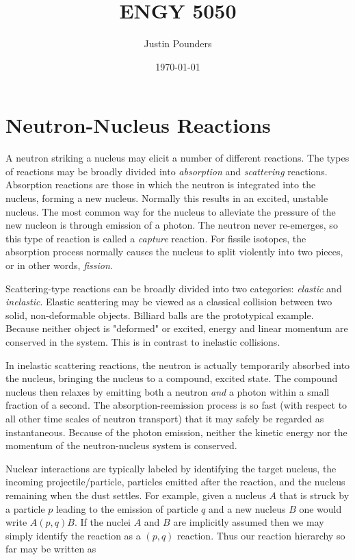 \documentclass[11pt]{article}
\author{Justin Pounders}
\date{\today}
\title{ENGY 5050}
\begin{document}
\maketitle
\tableofcontents


\section{Neutron-Nucleus Reactions}
\label{sec:orgheadline11}
A neutron striking a nucleus may elicit a number of different reactions.  The types of reactions may be broadly divided into \emph{absorption} and \emph{scattering} reactions.  Absorption reactions are those in which the neutron is integrated into the nucleus, forming a new nucleus.  Normally this results in an excited, unstable nucleus.  The most common way for the nucleus to alleviate the pressure of the new nucleon is through emission of a photon.  The neutron never re-emerges, so this type of reaction is called a \emph{capture} reaction.  For fissile isotopes, the absorption process normally causes the nucleus to split violently into two pieces, or in other words, \emph{fission}.

Scattering-type reactions can be broadly divided into two categories: \emph{elastic} and \emph{inelastic}.  Elastic scattering may be viewed as a classical collision between two solid, non-deformable objects.  Billiard balls are the prototypical example.  Because neither object is "deformed" or excited, energy and linear momentum are conserved in the system.  This is in contrast to inelastic collisions.  

In inelastic scattering reactions, the neutron is actually temporarily absorbed into the nucleus, bringing the nucleus to a compound, excited state.  The compound nucleus then relaxes by emitting both a neutron \emph{and} a photon within a small fraction of a second.  The absorption-reemission process is so fast (with respect to all other time scales of neutron transport) that it may safely be regarded as instantaneous.  Because of the photon emission, neither the kinetic energy nor the momentum of the neutron-nucleus system is conserved.

Nuclear interactions are typically labeled by identifying the target nucleus, the incoming projectile/particle, particles emitted after the reaction, and the nucleus remaining when the dust settles.  For example, given a nucleus \(A\) that is struck by a particle \(p\) leading to the emission of particle \(q\) and a new nucleus \(B\) one would write \(A(p,q)B\).  If the nuclei \(A\) and \(B\) are implicitly assumed then we may simply identify the reaction as a \((p,q)\) reaction.  Thus our reaction hierarchy so far may be written as
\end{document}
